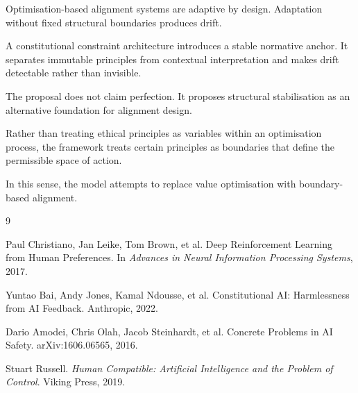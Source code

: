 \documentclass[11pt]{article}
\begin{document}
Optimisation-based alignment systems are adaptive by design. Adaptation without fixed structural boundaries produces drift.

A constitutional constraint architecture introduces a stable normative anchor. It separates immutable principles from contextual interpretation and makes drift detectable rather than invisible.

The proposal does not claim perfection. It proposes structural stabilisation as an alternative foundation for alignment design.

Rather than treating ethical principles as variables within an optimisation process, the framework treats certain principles as boundaries that define the permissible space of action.

In this sense, the model attempts to replace value optimisation with boundary-based alignment.



\begin{thebibliography}{9}

Paul Christiano, Jan Leike, Tom Brown, et al.
\newblock Deep Reinforcement Learning from Human Preferences.
\newblock In \textit{Advances in Neural Information Processing Systems}, 2017.

Yuntao Bai, Andy Jones, Kamal Ndousse, et al.
\newblock Constitutional AI: Harmlessness from AI Feedback.
\newblock Anthropic, 2022.

Dario Amodei, Chris Olah, Jacob Steinhardt, et al.
\newblock Concrete Problems in AI Safety.
\newblock arXiv:1606.06565, 2016.

Stuart Russell.
\newblock \textit{Human Compatible: Artificial Intelligence and the Problem of Control}.
\newblock Viking Press, 2019.

\end{thebibliography}
\end{document}
